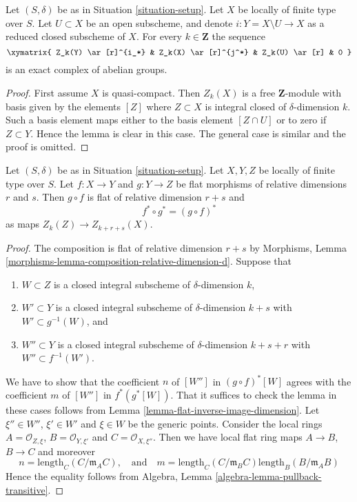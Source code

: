 \begin{lemma}
\label{lemma-exact-sequence-open}
Let $(S, \delta)$ be as in Situation \ref{situation-setup}.
Let $X$ be locally of finite type over $S$.
Let $U \subset X$ be an open subscheme, and denote
$i : Y = X \setminus U \to X$ as a reduced closed subscheme of $X$.
For every $k \in \mathbf{Z}$ the sequence
$$
\xymatrix{
Z_k(Y) \ar[r]^{i_*} & Z_k(X) \ar[r]^{j^*} & Z_k(U) \ar[r] & 0
}
$$
is an exact complex of abelian groups.
\end{lemma}

\begin{proof}
First assume $X$ is quasi-compact. Then $Z_k(X)$ is a free $\mathbf{Z}$-module
with basis given by the elements $[Z]$ where $Z \subset X$ is integral
closed of $\delta$-dimension $k$. Such a basis element maps
either to the basis element $[Z \cap U]$ or to zero if $Z \subset Y$.
Hence the lemma is clear in this case. The general case is similar
and the proof is omitted.
\end{proof}

\begin{lemma}
\label{lemma-compose-flat-pullback}
Let $(S, \delta)$ be as in Situation \ref{situation-setup}.
Let $X, Y, Z$ be locally of finite type over $S$.
Let $f : X \to Y$ and $g : Y \to Z$ be flat morphisms of relative dimensions
$r$ and $s$. Then $g \circ f$ is flat of relative dimension
$r + s$ and
$$
f^* \circ g^* = (g \circ f)^*
$$
as maps $Z_k(Z) \to Z_{k + r + s}(X)$.
\end{lemma}

\begin{proof}
The composition is flat of relative dimension $r + s$ by
Morphisms, Lemma \ref{morphisms-lemma-composition-relative-dimension-d}.
Suppose that
\begin{enumerate}
\item $W \subset Z$ is a closed integral subscheme of $\delta$-dimension $k$,
\item $W' \subset Y$ is a closed integral subscheme of $\delta$-dimension
$k + s$ with $W' \subset g^{-1}(W)$, and
\item $W'' \subset Y$ is a closed integral subscheme of $\delta$-dimension
$k + s + r$ with $W'' \subset f^{-1}(W')$.
\end{enumerate}
We have to show that the coefficient $n$ of $[W'']$ in
$(g \circ f)^*[W]$ agrees with the coefficient $m$ of
$[W'']$ in $f^*(g^*[W])$. That it suffices to check the lemma in these
cases follows from Lemma \ref{lemma-flat-inverse-image-dimension}.
Let $\xi'' \in W''$, $\xi' \in W'$
and $\xi \in W$ be the generic points. Consider the local rings
$A = \mathcal{O}_{Z, \xi}$, $B = \mathcal{O}_{Y, \xi'}$
and $C = \mathcal{O}_{X, \xi''}$. Then we have local flat ring maps
$A \to B$, $B \to C$ and moreover
$$
n = \text{length}_C(C/\mathfrak m_AC),
\quad
\text{and}
\quad
m = \text{length}_C(C/\mathfrak m_BC) \text{length}_B(B/\mathfrak m_AB)
$$
Hence the equality follows from
Algebra, Lemma \ref{algebra-lemma-pullback-transitive}.
\end{proof}

